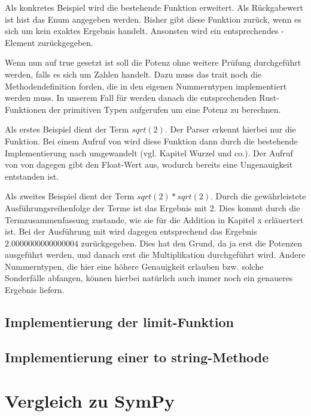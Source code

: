 \documentclass[11pt,a4paper, ngerman]{article}
\begin{document}
Als konkretes Beispiel wird die bestehende Funktion  erweitert. Als Rückgabewert ist hist das Enum  angegeben werden. Bisher gibt diese Funktion  zurück, wenn es sich um kein exaktes Ergebnis handelt. Ansonsten wird ein entsprechendes -Element zurückgegeben.

Wenn nun  auf true gesetzt ist soll die Potenz ohne weitere Prüfung durchgeführt werden, falls es sich um Zahlen handelt. Dazu muss das trait  noch die Methodendefinition  forden, die in den eigenen Nummerntypen implementiert werden muss. In unserem Fall für  werden danach die entsprechenden Rust-Funktionen der primitiven Typen aufgerufen um eine Potenz zu berechnen.

Als erstes Beispiel dient der Term $sqrt(2)$. Der Parser erkennt hierbei nur die Funktion. Bei einem Aufruf von  wird diese Funktion dann durch die bestehende Implementierung nach  umgewandelt (vgl. Kapitel Wurzel und co.). Der Aufruf von von  dagegen gibt den Float-Wert  aus, wodurch bereits eine Ungenauigkeit entstanden ist.

Als zweites Beispiel dient der Term $sqrt(2)*sqrt(2)$. Durch die gewährleistete Ausführungsreihenfolge der Terme ist das Ergebnis mit  $2$. Dies kommt durch die Termzusammenfassung zustande, wie sie für die Addition in Kapitel x erläuertert ist. Bei der Ausführung mit  wird dagegen entsprechend das Ergebnis $2.0000000000000004$ zurückgegeben. Dies hat den Grund, da ja erst die Potenzen ausgeführt werden, und danach erst die Multiplikation durchgeführt wird. Andere Nummerntypen, die hier eine höhere Genauigkeit erlauben bzw. solche Sonderfälle abfangen, können hierbei natürlich auch immer noch ein genaueres Ergebnis liefern.

\subsection{Implementierung der limit-Funktion}
\subsection{Implementierung einer to string-Methode}

\newpage

\section{Vergleich zu SymPy}
\end{document}
